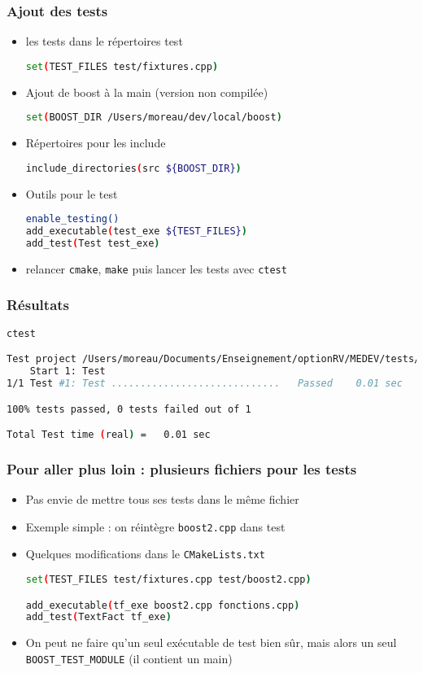 \begin{frame}[fragile]
\frametitle{Ajout des tests}
\begin{itemize}
\item les tests dans le répertoires test
\begin{lstlisting}[language=Bash]
set(TEST_FILES test/fixtures.cpp)
\end{lstlisting}
\item Ajout de boost à la main (version non compilée)
\begin{lstlisting}[language=Bash]
set(BOOST_DIR /Users/moreau/dev/local/boost)
\end{lstlisting}
\item Répertoires pour les include
\begin{lstlisting}[language=Bash]
include_directories(src ${BOOST_DIR})
\end{lstlisting}
\item Outils pour le test
\begin{lstlisting}[language=Bash]
enable_testing()
add_executable(test_exe ${TEST_FILES})
add_test(Test test_exe)
\end{lstlisting}
\item relancer \texttt{cmake}, \texttt{make} puis lancer les tests avec \texttt{ctest}
\end{itemize}
\end{frame}

\begin{frame}[fragile]
\frametitle{Résultats}
\begin{lstlisting}[language=Bash]
ctest

Test project /Users/moreau/Documents/Enseignement/optionRV/MEDEV/tests/code/boost/build
    Start 1: Test
1/1 Test #1: Test .............................   Passed    0.01 sec

100% tests passed, 0 tests failed out of 1

Total Test time (real) =   0.01 sec
\end{lstlisting}

\end{frame}

\begin{frame}[fragile]
\frametitle{Pour aller plus loin : plusieurs fichiers pour les tests}
\begin{itemize}
\item Pas envie de mettre tous ses tests dans le même fichier
\item Exemple simple : on réintègre \texttt{boost2.cpp} dans test
\item Quelques modifications dans le \texttt{CMakeLists.txt}
\begin{lstlisting}[language=Bash]
set(TEST_FILES test/fixtures.cpp test/boost2.cpp)

add_executable(tf_exe boost2.cpp fonctions.cpp)
add_test(TextFact tf_exe)
\end{lstlisting}
\item On peut ne faire qu'un seul exécutable de test bien sûr, mais alors un seul \texttt{BOOST\_TEST\_MODULE} (il contient un main)
\end{itemize}
\end{frame}

